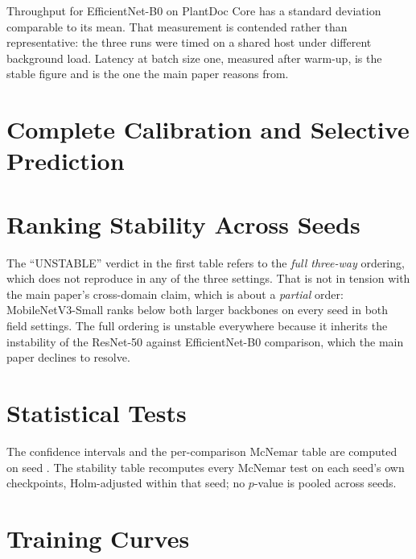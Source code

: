 \documentclass[runningheads]{llncs}
\begin{document}


\noindent
Throughput for EfficientNet-B0 on PlantDoc Core has a standard deviation
comparable to its mean. That measurement is contended rather than
representative: the three runs were timed on a shared host under different
background load. Latency at batch size one, measured after warm-up, is the
stable figure and is the one the main paper reasons from.

\section{Complete Calibration and Selective Prediction}




\section{Ranking Stability Across Seeds}




\noindent
The ``UNSTABLE'' verdict in the first table refers to the \emph{full three-way}
ordering, which does not reproduce in any of the three settings. That is not in
tension with the main paper's cross-domain claim, which is about a
\emph{partial} order: MobileNetV3-Small ranks below both larger backbones on
every seed in both field settings. The full ordering is unstable everywhere
because it inherits the instability of the ResNet-50 against EfficientNet-B0
comparison, which the main paper declines to resolve.

\section{Statistical Tests}





\noindent
The confidence intervals and the per-comparison McNemar table are computed on
seed \SigSeed{}. The stability table recomputes every McNemar test on each
seed's own checkpoints, Holm-adjusted within that seed; no $p$-value is pooled
across seeds.

\section{Training Curves}
\end{document}

